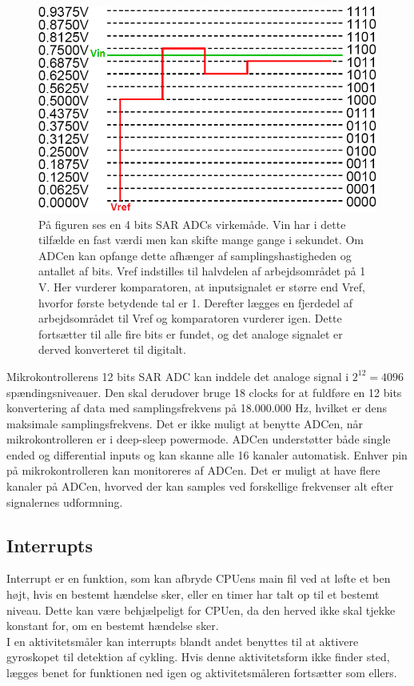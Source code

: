 \begin{figure}[H]
	\centering
	\includegraphics[scale=0.6]{figures/bProblemloesning/SAR_ADC.png}
	\caption{På figuren ses en 4 bits SAR ADCs virkemåde. Vin har i dette tilfælde en fast værdi men kan skifte mange gange i sekundet. Om ADCen kan opfange dette afhænger af samplingshastigheden og antallet af bits. Vref indstilles til halvdelen af arbejdsområdet på 1 V. Her vurderer komparatoren, at inputsignalet er større end Vref, hvorfor første betydende tal er 1. Derefter lægges en fjerdedel af arbejdsområdet til Vref og komparatoren vurderer igen. Dette fortsætter til alle fire bits er fundet, og det analoge signalet er derved konverteret til digitalt.}
	\label{fig:SAR_ADC}
\end{figure}\vspace{-0.5cm}
Mikrokontrollerens 12 bits SAR ADC kan inddele det analoge signal i $2^{12} = 4096$ spændingsniveauer. Den skal derudover bruge 18 clocks for at fuldføre en 12 bits konvertering af data med samplingsfrekvens på 18.000.000 Hz, hvilket er dens maksimale samplingsfrekvens. Det er ikke muligt at benytte ADCen, når mikrokontrolleren er i deep-sleep powermode. \newline 
ADCen understøtter både single ended og differential inputs og kan skanne alle 16 kanaler automatisk. Enhver pin på mikrokontrolleren kan monitoreres af ADCen. Det er muligt at have flere kanaler på ADCen, hvorved der kan samples ved forskellige frekvenser alt efter signalernes udformning. \citep{Semiconductor20164200M}

\subsection{Interrupts}
Interrupt er en funktion, som kan afbryde CPUens main fil ved at løfte et ben højt, hvis en bestemt hændelse sker, eller en timer har talt op til et bestemt niveau. Dette kan være behjælpeligt for CPUen, da den herved ikke skal tjekke konstant for, om en bestemt hændelse sker. \citep{Badiger2016} \\
I en aktivitetsmåler kan interrupts blandt andet benyttes til at aktivere gyroskopet til detektion af cykling. Hvis denne aktivitetsform ikke finder sted, lægges benet for funktionen ned igen og aktivitetsmåleren fortsætter som ellers.

